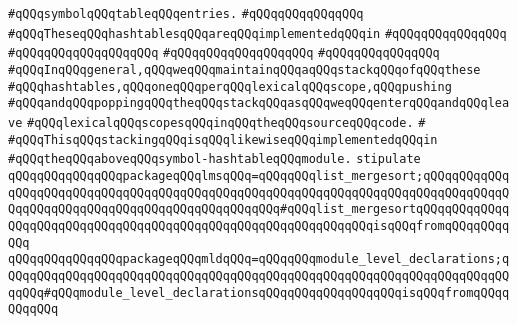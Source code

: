 \verb|#qQQqsymbolqQQqtableqQQqentries.|\newline
\verb|#qQQqqQQqqQQqqQQq|\newline
\verb|#qQQqTheseqQQqhashtablesqQQqareqQQqimplementedqQQqin|\newline
\verb|#qQQqqQQqqQQqqQQq|\newline
\verb|#qQQqqQQqqQQqqQQqqQQq|\newline
\verb|#qQQqqQQqqQQqqQQqqQQq|\newline
\verb|#qQQqqQQqqQQqqQQq|\newline
\verb|#qQQqInqQQqgeneral,qQQqweqQQqmaintainqQQqaqQQqstackqQQqofqQQqthese|\newline
\verb|#qQQqhashtables,qQQqoneqQQqperqQQqlexicalqQQqscope,qQQqpushing|\newline
\verb|#qQQqandqQQqpoppingqQQqtheqQQqstackqQQqasqQQqweqQQqenterqQQqandqQQqleave|\newline
\verb|#qQQqlexicalqQQqscopesqQQqinqQQqtheqQQqsourceqQQqcode.|\newline
\verb|#|\newline
\verb|#qQQqThisqQQqstackingqQQqisqQQqlikewiseqQQqimplementedqQQqin|\newline
\verb|#qQQqtheqQQqaboveqQQqsymbol-hashtableqQQqmodule.|\newline
\newline
\newline
\verb|stipulate|\newline
\verb|qQQqqQQqqQQqqQQqpackageqQQqlmsqQQq=qQQqqQQqlist_mergesort;qQQqqQQqqQQqqQQqqQQqqQQqqQQqqQQqqQQqqQQqqQQqqQQqqQQqqQQqqQQqqQQqqQQqqQQqqQQqqQQqqQQqqQQqqQQqqQQqqQQqqQQqqQQqqQQqqQQqqQQq#qQQqlist_mergesortqQQqqQQqqQQqqQQqqQQqqQQqqQQqqQQqqQQqqQQqqQQqqQQqqQQqqQQqqQQqqQQqisqQQqfromqQQqqQQqqQQq|\newline
\verb|qQQqqQQqqQQqqQQqpackageqQQqmldqQQq=qQQqqQQqmodule_level_declarations;qQQqqQQqqQQqqQQqqQQqqQQqqQQqqQQqqQQqqQQqqQQqqQQqqQQqqQQqqQQqqQQqqQQqqQQqqQQq#qQQqmodule_level_declarationsqQQqqQQqqQQqqQQqqQQqisqQQqfromqQQqqQQqqQQq|\newline

